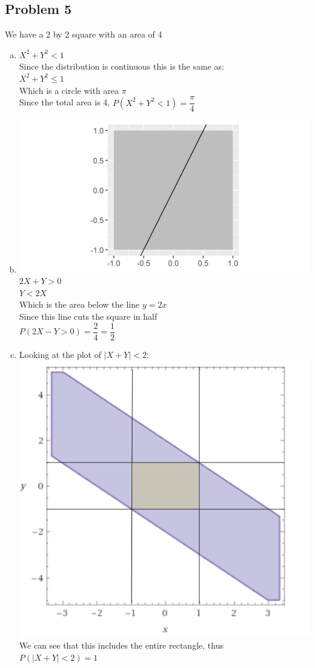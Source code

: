\documentclass{article}
\begin{document}
\begin{flushleft}
\section*{Problem 5}
We have a 2 by 2 square with an area of 4
\begin{enumerate}[(a)]
\item
$X^2+Y^2<1$\\
Since the distribution is continuous this is the same as:\\
$X^2+Y^2\leq 1$\\
Which is a circle with area  $\pi$\\
Since the total area is 4, $P(X^2+Y^2<1)=\dfrac{\pi}{4}$
\item
\includegraphics[scale=.7]{plot2.png}\\
$2X+Y>0$\\
$Y<2X$\\
Which is the area below the line $y=2x$\\
Since this line cuts the square in half\\
$P(2X-Y>0)=\dfrac{2}{4}=\dfrac{1}{2}$
\item 
Looking at the plot of $|X+Y|<2$:\\
\includegraphics[scale=.4]{abs.png}\\
We can see that this includes the entire rectangle, thus\\
$P(|X+Y|<2)=1$
\end{enumerate}
\pagebreak

\end{flushleft}
\end{document}
